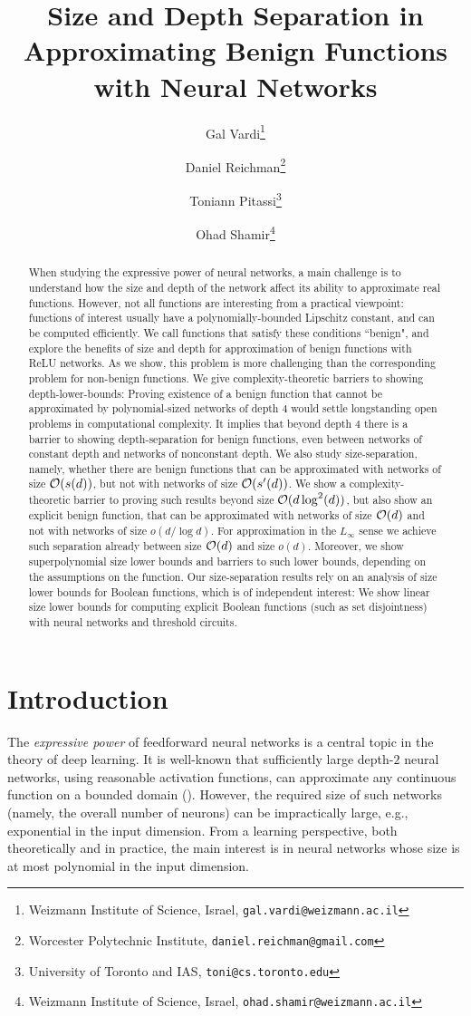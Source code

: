 \documentclass[11pt]{article}
\title{Size and Depth Separation in Approximating Benign Functions\\
with Neural Networks}
\author{
	Gal Vardi\thanks{Weizmann Institute of Science, Israel, \texttt{gal.vardi@weizmann.ac.il}}
	\and
	Daniel Reichman\thanks{Worcester Polytechnic Institute, \texttt{daniel.reichman@gmail.com}}
	\and
	Toniann Pitassi\thanks{University of Toronto and IAS, \texttt{toni@cs.toronto.edu}}
	\and
	Ohad Shamir\thanks{Weizmann Institute of Science, Israel, \texttt{ohad.shamir@weizmann.ac.il}}
}
\date{}
\newcommand{\co}{{\cal O}}
\begin{document}
\maketitle

\begin{abstract}
When studying the expressive power of neural networks, a main challenge  is to understand how the size and depth of the network affect its ability to approximate real functions. 
However, not all functions are interesting from a practical viewpoint: functions of interest usually have a polynomially-bounded Lipschitz constant, and can be computed efficiently. We call functions that satisfy these conditions ``benign", and explore the benefits of size and depth for approximation of benign functions with ReLU networks.
As we show, this problem is more challenging than the corresponding problem for non-benign functions.
We give complexity-theoretic barriers to showing depth-lower-bounds: 
Proving existence of a benign function that cannot be approximated by polynomial-sized networks of depth $4$ would settle longstanding open problems in computational complexity. It implies that beyond depth $4$ there is a barrier to showing depth-separation for benign functions, even between networks of constant depth and networks of nonconstant depth. 
We also study size-separation, namely, whether there are benign functions that can be approximated with networks of size $\co(s(d))$, but not with networks of size $\co(s'(d))$. We show a complexity-theoretic barrier to proving such results beyond size $\co(d\log^2(d))$, but also show an explicit benign function, that can be approximated with networks of size $\co(d)$ and not with networks of size $o(d/\log d)$. For approximation in the $L_\infty$ sense we achieve such separation already between size $\co(d)$ and size $o(d)$.
Moreover, we show superpolynomial size lower bounds and barriers to such lower bounds, depending on the assumptions on the function.
Our size-separation results rely on an analysis of size lower bounds for Boolean functions, which is of independent interest: We show linear size lower bounds for computing explicit Boolean functions (such as set disjointness) with neural networks and threshold circuits. 
\end{abstract}

\section{Introduction}

The {\em expressive power} of feedforward neural networks is a central topic in the theory of deep learning. It is well-known that sufficiently large depth-$2$ neural networks, using reasonable activation functions, can approximate any continuous function on a bounded domain (\cite{cybenko1989approximation,funahashi1989approximate,hornik1991approximation,barron1994approximation}). However, the required size of such networks (namely, the overall number of neurons) can be impractically large, e.g., exponential in the input dimension. From a learning perspective, both theoretically and in practice, the main interest is in neural networks 
whose size is at most polynomial in the input dimension.
\end{document}
